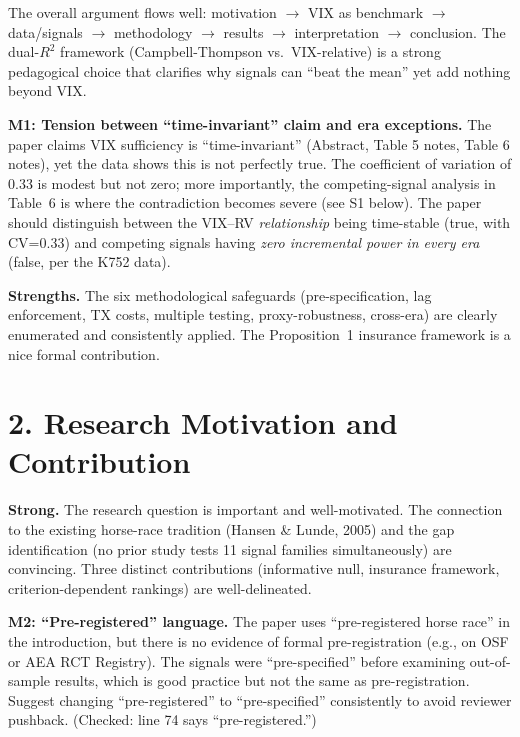 \documentclass[12pt,a4paper]{article}
\begin{document}
The overall argument flows well: motivation $\to$ VIX as benchmark $\to$ data/signals $\to$ methodology $\to$ results $\to$ interpretation $\to$ conclusion. The dual-$R^2$ framework (Campbell-Thompson vs.\ VIX-relative) is a strong pedagogical choice that clarifies why signals can ``beat the mean'' yet add nothing beyond VIX.

\textcolor{warncolor}{\textbf{M1: Tension between ``time-invariant'' claim and era exceptions.}}
The paper claims VIX sufficiency is ``time-invariant'' (Abstract, Table 5 notes, Table 6 notes), yet the data shows this is not perfectly true. The coefficient of variation of 0.33 is modest but not zero; more importantly, the competing-signal analysis in Table~6 is where the contradiction becomes severe (see S1 below). The paper should distinguish between the VIX--RV \textit{relationship} being time-stable (true, with CV=0.33) and competing signals having \textit{zero incremental power in every era} (false, per the K752 data).

\textcolor{okgreen}{\textbf{Strengths.}} The six methodological safeguards (pre-specification, lag enforcement, TX costs, multiple testing, proxy-robustness, cross-era) are clearly enumerated and consistently applied. The Proposition~1 insurance framework is a nice formal contribution.

\section*{2. Research Motivation and Contribution}

\textcolor{okgreen}{\textbf{Strong.}} The research question is important and well-motivated. The connection to the existing horse-race tradition (Hansen \& Lunde, 2005) and the gap identification (no prior study tests 11 signal families simultaneously) are convincing. Three distinct contributions (informative null, insurance framework, criterion-dependent rankings) are well-delineated.

\textcolor{warncolor}{\textbf{M2: ``Pre-registered'' language.}}
The paper uses ``pre-registered horse race'' in the introduction, but there is no evidence of formal pre-registration (e.g., on OSF or AEA RCT Registry). The signals were ``pre-specified'' before examining out-of-sample results, which is good practice but not the same as pre-registration. Suggest changing ``pre-registered'' to ``pre-specified'' consistently to avoid reviewer pushback. (Checked: line 74 says ``pre-registered.'')
\end{document}
